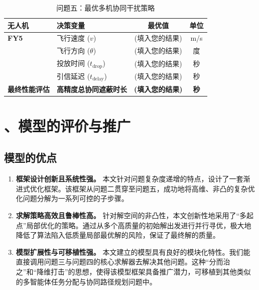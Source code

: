 \documentclass[12pt]{article}
\begin{document}
\begin{CJK}{UTF8}{gbsn}
		\begin{table}[H]
			\centering
			\caption{问题五：最优多机协同干扰策略}
			\label{tab:q53_results}
				\begin{tabular}{@{}llcc@{}}
					\toprule
					\textbf{无人机} & \textbf{决策变量} & \textbf{最优值} & \textbf{单位} \\
					\midrule
					\textbf{FY5} & 飞行速度 ($v$) & (填入您的结果) & m/s \\
					& 飞行方向 ($\theta$) & (填入您的结果) & 度 \\
					& 投放时间 ($t_{\text{drop}}$) & (填入您的结果) & 秒 \\
					& 引信延迟 ($t_{\text{delay}}$) & (填入您的结果) & 秒 \\
					\midrule
					\textbf{最终性能评估} & \textbf{高精度总协同遮蔽时长} & \textbf{(填入您的结果)} & \textbf{秒} \\
					\bottomrule
				\end{tabular}
			\end{table}
			
		\section{、模型的评价与推广}
		
		\subsection{模型的优点}
		\begin{enumerate}
			\item \textbf{框架设计创新且系统性强。} 本文针对问题复杂度递增的特点，设计了一套渐进式优化框架。该框架从问题二贯穿至问题五，成功地将高维、非凸的复杂优化问题分解为一系列可控的子步骤。
			
			\item \textbf{求解策略高效且鲁棒性高。} 针对解空间的非凸性，本文创新性地采用了“多起点”局部优化的策略。通过从多个高质量的初始解出发进行并行寻优，极大地降低了算法陷入低质量局部最优解的风险，保证了最终解的质量。
			
			\item \textbf{模型扩展性与可移植性强。} 本文建立的模型具有良好的模块化特性。我们能直接调用问题三与问题四的核心求解器去解决其他问题。这种“分而治之”和“降维打击”的思想，使得该模型框架具备推广潜力，可移植到其他类似的多智能体任务分配与协同路径规划问题中。
			
		\end{enumerate}
		

\end{CJK}
\end{document}
